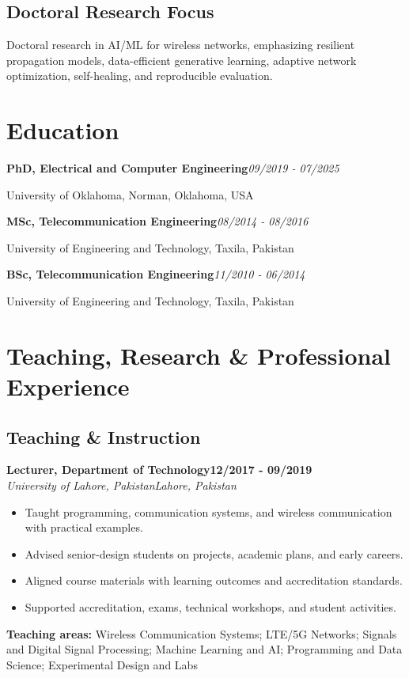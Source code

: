 \documentclass[9pt,letterpaper]{extarticle}
\newcommand{\role}[4]{%
  \Needspace{4\baselineskip}\textbf{#1}\hfill\textbf{#2}\\[-1pt]
  \textit{#3}\hfill\textit{#4}\par}
\newcommand{\entry}[2]{\Needspace{4\baselineskip}\textbf{#1}\hfill\textit{#2}\par}
\begin{document}
\subsection{Doctoral Research Focus}
Doctoral research in AI/ML for wireless networks, emphasizing resilient propagation models, data-efficient generative learning, adaptive network optimization, self-healing, and reproducible evaluation.\par
{}
\section{Education}
\entry{PhD, Electrical and Computer Engineering}{09/2019 - 07/2025}
University of Oklahoma, Norman, Oklahoma, USA\par
\entry{MSc, Telecommunication Engineering}{08/2014 - 08/2016}
University of Engineering and Technology, Taxila, Pakistan\par
\entry{BSc, Telecommunication Engineering}{11/2010 - 06/2014}
University of Engineering and Technology, Taxila, Pakistan\par
{}
\section{Teaching, Research \& Professional Experience}
\subsection{Teaching \& Instruction}
\role{Lecturer, Department of Technology}{12/2017 - 09/2019}{University of Lahore, Pakistan}{Lahore, Pakistan}
\begin{itemize}
\item Taught programming, communication systems, and wireless communication with practical examples.
\item Advised senior-design students on projects, academic plans, and early careers.
\item Aligned course materials with learning outcomes and accreditation standards.
\item Supported accreditation, exams, technical workshops, and student activities.
\end{itemize}
\vspace{1pt}
{\small\textbf{Teaching areas:} Wireless Communication Systems; LTE/5G Networks; Signals and Digital Signal Processing; Machine Learning and AI; Programming and Data Science; Experimental Design and Labs}\par
{}
\end{document}
